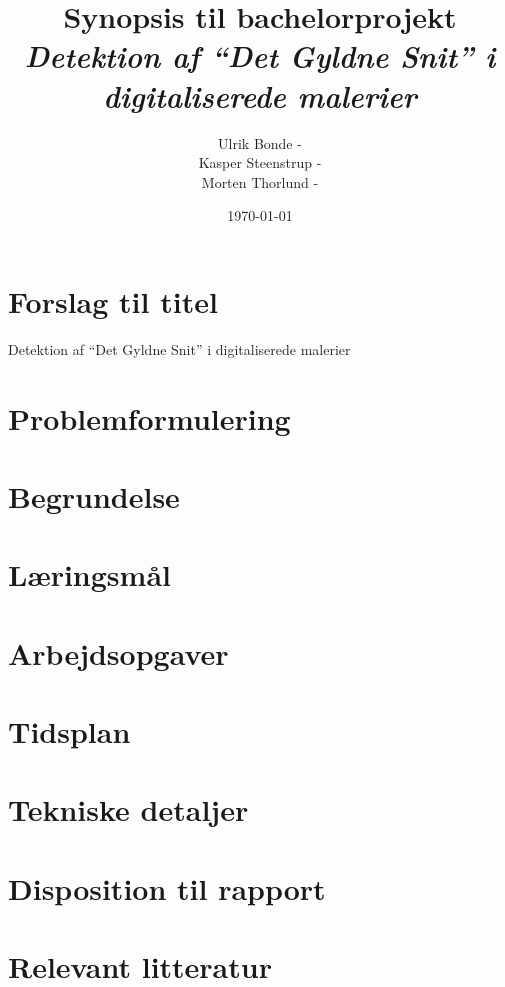 \documentclass[a4paper, 10pt, danish, final]{article}
\title{{\Large Synopsis til bachelorprojekt}\\\emph{Detektion af ``Det Gyldne Snit'' i digitaliserede malerier}}
\author{Ulrik Bonde - \mailto{bonde@diku.dk}\\
Kasper Steenstrup - \mailto{khsj@diku.dk}\\
Morten Thorlund - \mailto{thorlund@diku.dk}}
\date{\today}
\begin{document}
\maketitle
\thispagestyle{empty}




\section*{Forslag til titel}
Detektion af ``Det Gyldne Snit'' i digitaliserede malerier

\section*{Problemformulering}


\section*{Begrundelse}


\section*{Læringsmål}


\section*{Arbejdsopgaver}


\section*{Tidsplan}


\section*{Tekniske detaljer}


\section*{Disposition til rapport}


\section*{Relevant litteratur}

\end{document}
